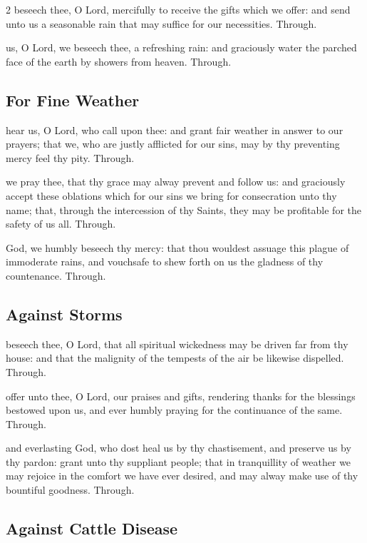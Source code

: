 \begin{multicols}{2}
\secret
{} beseech thee, O Lord, mercifully to receive the gifts which we offer: and send unto us a seasonable rain that may suffice for our necessities. Through.

\postcommunion
{} us, O Lord, we beseech thee, a refreshing rain: and graciously water the parched face of the earth by showers from heaven. Through.

\subsection{For Fine Weather}

\collect
{} hear us, O Lord, who call upon thee: and grant fair weather in answer to our prayers; that we, who are justly afflicted for our sins, may by thy preventing mercy feel thy pity. Through.

   \newcolumn

\secret
{} we pray thee, that thy grace may alway prevent and follow us: and graciously accept these oblations which for our sins we bring for consecration unto thy name; that, through the intercession of thy Saints, they may be profitable for the safety of us all. Through.

\postcommunion
{} God, we humbly beseech thy mercy: that thou wouldest assuage this plague of immoderate rains, and vouchsafe to shew forth on us the gladness of thy countenance. Through.


\subsection{Against Storms}

\collect
{} beseech thee, O Lord, that all spiritual wickedness may be driven far from thy house: and that the malignity of the tempests of the air be likewise dispelled. Through.

\secret
{} offer unto thee, O Lord, our praises and gifts, rendering thanks for the blessings bestowed upon us, and ever humbly praying for the continuance of the same. Through.

\postcommunion
{} and everlasting God, who dost heal us by thy chastisement, and preserve us by thy pardon: grant unto thy suppliant people; that in tranquillity of weather we may rejoice in the comfort we have ever desired, and may alway make use of thy bountiful goodness. Through.

\subsection{Against Cattle Disease}


\end{multicols}
